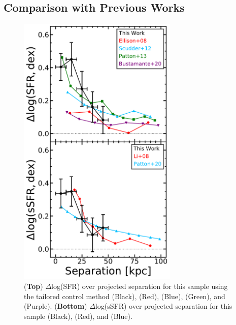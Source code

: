 \documentclass[iop,revtex4,twocolumn,apj,numberedappendix,appendixfloats]{emulateapj}
\newcommand{\reff}{$R_{\rm eff}$}
\begin{document}

\subsection{Comparison with Previous Works}

\begin{figure}
\centering
\includegraphics[width=3in]{fig/nuc_sep.pdf}
\caption[]{(\textbf{Top}) $\Delta$log(SFR) over projected separation for this sample using the tailored control method (Black), \citet{Ellison:2008} (Red),  \citet{Scudder:2012} (Blue), \citet{Patton:2013} (Green), and \citet{Bustamante:2020} (Purple). (\textbf{Bottom}) $\Delta$log(sSFR) over projected separation for this sample (Black), \citet{Li:2008} (Red), and \citet{Patton:2020} (Blue).  }
\label{fig:nuc_sep}
\end{figure}
\end{document}
